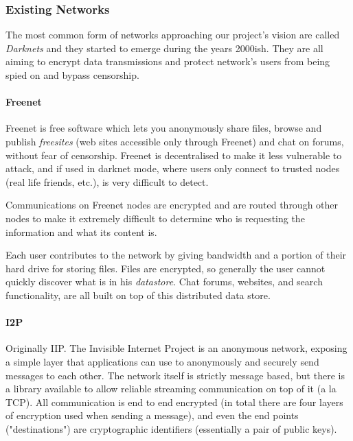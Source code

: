 
\subsubsection{Existing Networks}
The most common form of networks approaching our project's vision are called \textit{Darknets}\cite{Biddle2003TheProtection} and they started to emerge during the years 2000ish\cite{Delmer2009LemergenceI2p}. They are all aiming to encrypt data transmissions and protect network's users from being spied on and bypass censorship.

\paragraph{Freenet\cite{Clarke1999ASystem,Clarke2001Freenet:System}}
Freenet is free software which lets you anonymously share files, browse and publish \textit{freesites} (web sites accessible only through Freenet) and chat on forums, without fear of censorship. Freenet is decentralised to make it less vulnerable to attack, and if used in \textit{}darknet mode, where users only connect to trusted nodes (real life friends, etc.), is very difficult to detect. 

Communications on Freenet nodes are encrypted and are routed through other nodes to make it extremely difficult to determine who is requesting the information and what its content is.

Each user contributes to the network by giving bandwidth and a portion of their hard drive for storing files. Files are encrypted, so generally the user cannot quickly discover what is in his \textit{datastore}. Chat forums, websites, and search functionality, are all built on top of this distributed data store.

\paragraph{I2P\cite{Foodists2003TheInternet}}
Originally IIP\cite{IIP2003InvisibleProject}. The Invisible Internet Project is an anonymous network, exposing a simple layer that applications can use to anonymously and securely send messages to each other. The network itself is strictly message based, but there is a library available to allow reliable streaming communication on top of it (a la TCP). All communication is end to end encrypted (in total there are four layers of encryption used when sending a message), and even the end points ("destinations") are cryptographic identifiers (essentially a pair of public keys).

